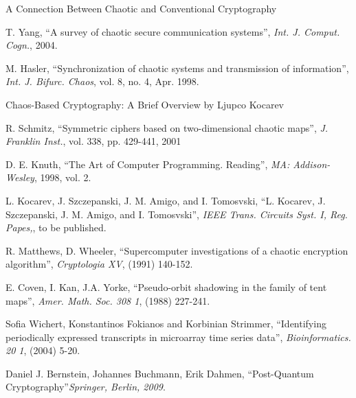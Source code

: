 \documentclass{iitgthesis}
\begin{document}
%
\begin{thebibliography}{11}
\begin{small}

A Connection Between Chaotic and Conventional Cryptography

T. Yang, ``A survey of chaotic secure communication systems'', {\em Int. J. Comput. Cogn.}, 2004.

M. Hasler, ``Synchronization of chaotic systems and transmission of information'', {\em Int. J. Bifurc. Chaos}, vol. 8, no. 4, Apr. 1998.

Chaos-Based Cryptography: A Brief Overview by Ljupco Kocarev

R. Schmitz, ``Symmetric ciphers based on two-dimensional chaotic maps'', {\em J. Franklin Inst.}, vol. 338, pp. 429-441, 2001

D. E. Knuth, ``The Art of Computer Programming. Reading'', {\em MA: Addison-Wesley}, 1998, vol. 2.

L. Kocarev, J. Szczepanski, J. M. Amigo, and I. Tomosvski, ``L. Kocarev, J. Szczepanski, J. M. Amigo, and I. Tomosvski'', {\em IEEE Trans. Circuits Syst. I, Reg. Papes,}, to be published.

R. Matthews, D. Wheeler, ``Supercomputer investigations of a chaotic encryption algorithm'', {\em Cryptologia XV}, (1991) 140-152.

E. Coven, I. Kan, J.A. Yorke, ``Pseudo-orbit shadowing in the family of tent maps'', {\em Amer. Math. Soc. 308 1},  (1988) 227-241.

Sofia Wichert, Konstantinos Fokianos and Korbinian Strimmer, ``Identifying periodically expressed transcripts in microarray time series data'', {\em Bioinformatics. 20 1},  (2004) 5-20.

Daniel J. Bernstein, Johannes Buchmann, Erik Dahmen, ``Post-Quantum Cryptography''{\em Springer, Berlin, 2009}.

\end{small}
\end{thebibliography}

\end{document}
